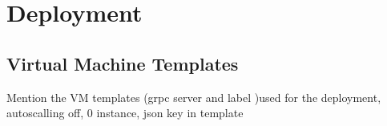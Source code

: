 \chapter{Deployment}\label{ch:deployment}

\section{Virtual Machine Templates}\label{sec:vm-templates}

Mention the VM templates (grpc server and label )used for the deployment,
autoscalling off, 0 instance, json key in template
